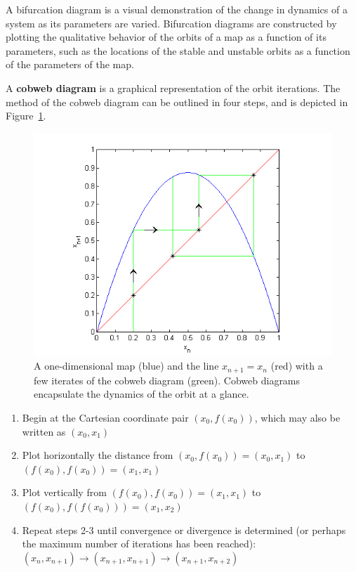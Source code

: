 A bifurcation diagram is a
visual demonstration of the change in dynamics of a system as its
parameters are varied. Bifurcation diagrams are constructed by
plotting the qualitative behavior of the orbits of a map as a function of its
parameters, such as the locations of the stable and unstable orbits as
a function of the parameters of the map. 

A \textbf{cobweb diagram} is a graphical representation of the orbit
iterations. The method of the cobweb diagram can be outlined in four
steps, and is depicted in Figure~\ref{fig:cobex}.
\begin{figure}[!h]
\caption[Example of a cobweb diagram]{A one-dimensional map (blue) and
  the line $x_{n+1}=x_n$ (red) with a few iterates of the cobweb
  diagram (green). Cobweb diagrams encapsulate the dynamics of the orbit at a glance.}\label{fig:cobex}
    \begin{center}
	\includegraphics[scale=0.8]{figs/cobweb_ex.png}
    \end{center}
\end{figure}

\begin{enumerate}
\item Begin at the Cartesian coordinate pair $(x_0, f(x_0))$, which
  may also be written as $(x_0, x_1)$
\item Plot horizontally the distance from $(x_0, f(x_0))=(x_0, x_1)$ to $(f(x_0),
  f(x_0))=(x_1, x_1)$
\item Plot vertically from $(f(x_0), f(x_0))=(x_1, x_1)$ to $(f(x_0), f(f(x_0)))=(x_1, x_2)$
\item Repeat steps 2-3 until convergence or divergence is determined
  (or perhaps the maximum number of iterations has been reached):
  $(x_n, x_{n+1}) \to (x_{n+1}, x_{n+1}) \to (x_{n+1},x_{n+2})$
\end{enumerate}

